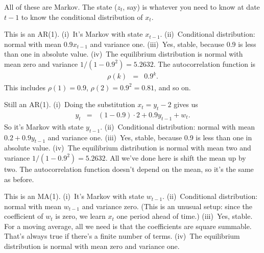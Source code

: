 \documentclass[11pt]{exam}
\begin{document}
\begin{questions}
\begin{solution}
All of these are Markov.
The state ($z_t$, say) is whatever you need to know at date $t-1$ to
know the conditional distribution of $x_t$.
\begin{parts}
\item This is an AR(1).
(i)~It's Markov with state $x_{t-1}$.
(ii)~Conditional distribution:  normal with mean $0.9 x_{t-1}$ and variance one.
(iii)~Yes, stable, because 0.9 is less than one in absolute value.
(iv)~The equilibrium distribution is normal with mean zero and variance
$1/(1-0.9^2) = 5.2632$.
The autocorrelation function is
\begin{eqnarray*}
    \rho(k) &=& 0.9^k .
\end{eqnarray*}
This includes $\rho(1) = 0.9$, $\rho(2) = 0.9^2 = 0.81$, and so on.

\item Still an AR(1).
(i)~Doing the substitution $x_t = y_t - 2$ gives us
\begin{eqnarray*}
    y_t &=& (1-0.9) \cdot 2 + 0.9 y_{t-1} + w_t .
\end{eqnarray*}
So it's Markov with state $y_{t-1}$.
(ii)~Conditional distribution:  normal with mean $0.2 + 0.9 y_{t-1}$ and variance one.
(iii)~Yes, stable, because 0.9 is less than one in absolute value.
(iv)~The equilibrium distribution is normal with mean two and variance
$1/(1-0.9^2) = 5.2632$.
All we've done here is shift the mean up by two.
The autocorrelation function doesn't depend on the mean, so it's the same
as before.

\item This is an MA(1).
(i)~It's Markov with state $w_{t-1}$.
(ii)~Conditional distribution:  normal with mean $w_{t-1}$ and variance zero.
(This is an unusual setup:  since the coefficient of $w_t$ is zero,
we learn $x_t$ one period ahead of time.)
(iii)~Yes, stable.  For a moving average, all we need is that
the coefficients are square summable.
That's always true if there's a finite number of terms.
(iv)~The equilibrium distribution is normal with mean zero and variance one.


\end{parts}
\end{solution}
\end{questions}
\end{document}
